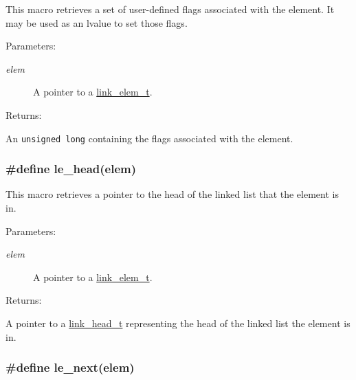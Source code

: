 This macro retrieves a set of user-defined flags associated with the element. It may be used as an lvalue to set those flags.\begin{Desc}
\item[Parameters: ]\par
\begin{description}
\item[{\em 
elem}]A pointer to a \hyperlink{group__dbprim__link_a1}{link\_\-elem\_\-t}.\end{description}
\end{Desc}
\begin{Desc}
\item[Returns: ]\par
An {\tt unsigned long} containing the flags associated with the element. \end{Desc}
\hypertarget{group__dbprim__link_a24}{
\subsubsection[le\_\-head]{\setlength{\rightskip}{0pt plus 5cm}\#define le\_\-head(elem)}}
\label{group__dbprim__link_a24}


This macro retrieves a pointer to the head of the linked list that the element is in.\begin{Desc}
\item[Parameters: ]\par
\begin{description}
\item[{\em 
elem}]A pointer to a \hyperlink{group__dbprim__link_a1}{link\_\-elem\_\-t}.\end{description}
\end{Desc}
\begin{Desc}
\item[Returns: ]\par
A pointer to a \hyperlink{group__dbprim__link_a0}{link\_\-head\_\-t} representing the head of the linked list the element is in. \end{Desc}
\hypertarget{group__dbprim__link_a21}{
\subsubsection[le\_\-next]{\setlength{\rightskip}{0pt plus 5cm}\#define le\_\-next(elem)}}
\label{group__dbprim__link_a21}


